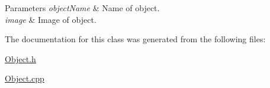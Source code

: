 \begin{DoxyParams}{Parameters}
{\em objectName} & Name of object. \\
\hline
{\em image} & Image of object. \\
\hline
\end{DoxyParams}


The documentation for this class was generated from the following files:\begin{DoxyCompactItemize}
\item 
\hyperlink{_object_8h}{Object.h}\item 
\hyperlink{_object_8cpp}{Object.cpp}\end{DoxyCompactItemize}
